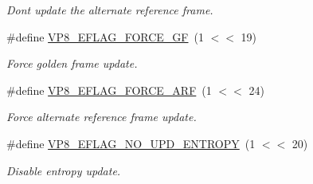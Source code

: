 \begin{DoxyCompactItemize}
\begin{DoxyCompactList}\small\item\em Don\textquotesingle{}t update the alternate reference frame. \end{DoxyCompactList}\item 
\#define \hyperlink{group__vp8__encoder_gacb64c00adcb361f72a9a3028eb12f5ff}{V\+P8\+\_\+\+E\+F\+L\+A\+G\+\_\+\+F\+O\+R\+C\+E\+\_\+\+GF}~(1 $<$$<$ 19)
\begin{DoxyCompactList}\small\item\em Force golden frame update. \end{DoxyCompactList}\item 
\#define \hyperlink{group__vp8__encoder_ga50584fe4bdb62ff935347576539650b7}{V\+P8\+\_\+\+E\+F\+L\+A\+G\+\_\+\+F\+O\+R\+C\+E\+\_\+\+A\+RF}~(1 $<$$<$ 24)
\begin{DoxyCompactList}\small\item\em Force alternate reference frame update. \end{DoxyCompactList}\item 
\#define \hyperlink{group__vp8__encoder_ga5b91ad179910d4efc23aef66c7b2148b}{V\+P8\+\_\+\+E\+F\+L\+A\+G\+\_\+\+N\+O\+\_\+\+U\+P\+D\+\_\+\+E\+N\+T\+R\+O\+PY}~(1 $<$$<$ 20)
\begin{DoxyCompactList}\small\item\em Disable entropy update. \end{DoxyCompactList}\end{DoxyCompactItemize}
